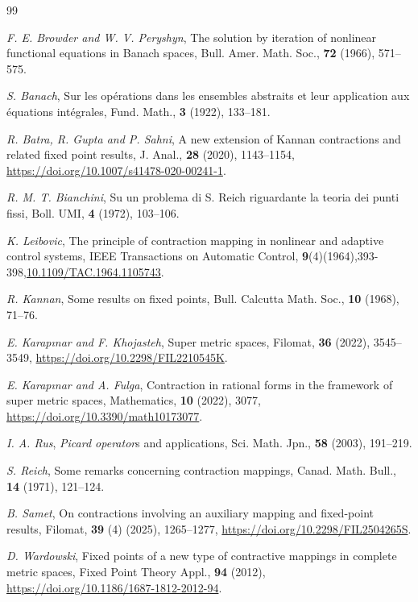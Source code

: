 \documentclass[pdflatex,sn-mathphys-num]{sn-jnl}%
\theoremstyle{thmstyleone}%
\theoremstyle{thmstyletwo}%
\theoremstyle{thmstylethree}%
\begin{document}
\begin{thebibliography}{99}

 {\it F. E. Browder and W. V. Peryshyn}, The solution by iteration of nonlinear functional equations in Banach spaces, Bull. Amer. Math. Soc., {\bf 72} (1966), 571--575.

 {\it S. Banach}, Sur les op\'erations dans les ensembles abstraits et leur application aux \'equations int\'egrales, Fund. Math., {\bf 3} (1922), 133--181.

 {\it R. Batra, R. Gupta and P. Sahni}, A new extension of Kannan contractions and related fixed point results, J. Anal., {\bf 28} (2020), 1143--1154, \url{https://doi.org/10.1007/s41478-020-00241-1}.

 {\it R. M. T. Bianchini}, Su un problema di S. Reich riguardante la teoria dei punti fissi, Boll. UMI, {\bf 4} (1972), 103--106.


 {\it K. Leibovic}, The principle of contraction mapping in nonlinear and adaptive control systems, IEEE Transactions on Automatic Control, {\bf 9}(4)(1964),393-398,\url{10.1109/TAC.1964.1105743}.


 {\it R. Kannan}, Some results on fixed points, Bull. Calcutta Math. Soc., {\bf 10} (1968), 71--76.

 {\it E. Karap\i nar and F. Khojasteh}, Super metric spaces, Filomat, {\bf 36} (2022), 3545--3549, \url{https://doi.org/10.2298/FIL2210545K}.

 {\it E. Karap\i nar and A. Fulga}, Contraction in rational forms in the framework of super metric spaces, Mathematics, {\bf 10} (2022), 3077, \url{https://doi.org/10.3390/math10173077}.



 {\it I. A. Rus}, \textit{Picard operator}s and applications, Sci. Math. Jpn., {\bf 58} (2003), 191--219.


 {\it S. Reich}, Some remarks concerning contraction mappings, Canad. Math. Bull., {\bf 14} (1971), 121--124.


 {\it B. Samet}, On contractions involving an auxiliary mapping and fixed-point results, Filomat, {\bf 39} (4) (2025), 1265--1277, \url{https://doi.org/10.2298/FIL2504265S}.



 {\it D. Wardowski}, Fixed points of a new type of contractive mappings in complete metric spaces, Fixed Point Theory Appl., {\bf 94} (2012), \url{https://doi.org/10.1186/1687-1812-2012-94}.


\end{thebibliography}
\end{document}
